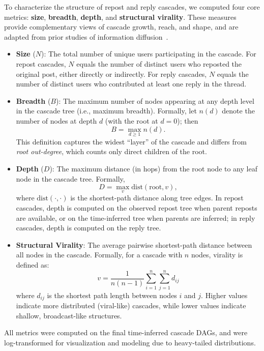 \documentclass[letterpaper]{article} %
\begin{document}
To characterize the structure of repost and reply cascades, we computed four core metrics: \textbf{size}, \textbf{breadth}, \textbf{depth}, and \textbf{structural virality}. These measures provide complementary views of cascade growth, reach, and shape, and are adapted from prior studies of information diffusion~\cite{vosoughi_spread_2018,goel_structural_2016}.

\begin{itemize}
    \item \textbf{Size} ($N$): The total number of unique users participating in the cascade. For repost cascades, $N$ equals the number of distinct users who reposted the original post, either directly or indirectly. For reply cascades, $N$ equals the number of distinct users who contributed at least one reply in the thread.
    
    \item \textbf{Breadth} ($B$): The maximum number of nodes appearing at any depth level in the cascade tree (i.e., maximum breadth). Formally, let $n(d)$ denote the number of nodes at depth $d$ (with the root at $d=0$); then
    \[
    B=\max_{d \ge 1} n(d).
    \]
    This definition captures the widest “layer” of the cascade and differs from \emph{root out-degree}, which counts only direct children of the root.
    
    \item \textbf{Depth} ($D$): The maximum distance (in hops) from the root node to any leaf node in the cascade tree. Formally,
    \[
    D=\max_{v} \mathrm{dist}(\text{root}, v),
    \]
    where $\mathrm{dist}(\cdot,\cdot)$ is the shortest-path distance along tree edges. In repost cascades, depth is computed on the observed repost tree when parent reposts are available, or on the time-inferred tree when parents are inferred; in reply cascades, depth is computed on the reply tree.

    \item \textbf{Structural Virality}: The average pairwise shortest-path distance between all nodes in the cascade. Formally, for a cascade with \( n \) nodes, virality is defined as:
    \[
        v = \frac{1}{n(n - 1)} \sum_{i=1}^{n} \sum_{j=1}^{n} d_{ij}
    \]
    where \( d_{ij} \) is the shortest path length between nodes \( i \) and \( j \). Higher values indicate more distributed (viral-like) cascades, while lower values indicate shallow, broadcast-like structures.
\end{itemize}

All metrics were computed on the final time-inferred cascade DAGs, and were log-transformed for visualization and modeling due to heavy-tailed distributions.
\end{document}
